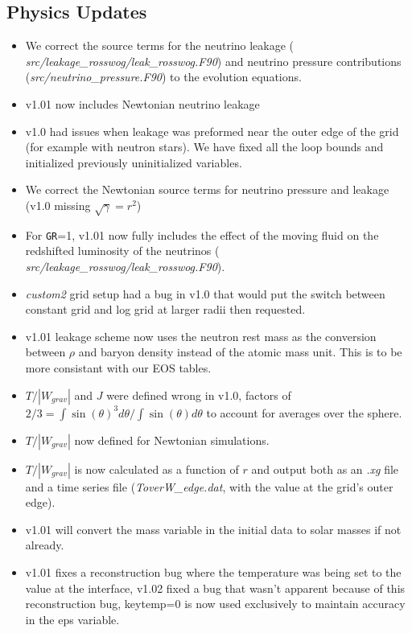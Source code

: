 \documentclass[10pt,nofootinbib]{article}
\begin{document}
\subsection{Physics Updates}
\begin{itemize}
\item We correct the source terms for the neutrino leakage ({\it
    src/leakage\_rosswog/leak\_rosswog.F90}) and neutrino pressure
  contributions ({\it src/neutrino\_pressure.F90}) to the evolution
  equations.
\item v1.01 now includes Newtonian neutrino leakage
\item v1.0 had issues when leakage was preformed near the outer edge
  of the grid (for example with neutron stars).  We have fixed all the
  loop bounds and initialized previously uninitialized variables. 
\item We correct the Newtonian source terms for neutrino pressure and
  leakage (v1.0 missing $\sqrt{\gamma}=r^2$)
\item For {\tt GR}=1, v1.01 now fully includes the effect of the
  moving fluid on the redshifted luminosity of the neutrinos ({\it
    src/leakage\_rosswog/leak\_rosswog.F90}).
\item {\emph{custom2}} grid setup had a bug in v1.0 that would put the
  switch between constant grid and log grid at larger radii then
  requested.
\item v1.01 leakage scheme now uses the neutron rest mass as the
  conversion between $\rho$ and baryon density instead of the atomic
  mass unit.  This is to be more consistant with our EOS tables. 
\item $T/|W_{grav}|$ and $J$ were defined wrong in v1.0, factors of
  $2/3 = \int \sin(\theta)^3 d\theta / \int \sin(\theta)d\theta$ to
  account for averages over the sphere.
\item $T/|W_{grav}|$ now defined for Newtonian simulations.
\item $T/|W_{grav}|$ is now calculated as a function of $r$ and output
  both as an {\emph{.xg}} file and a time series file
  ({\emph{ToverW\_edge.dat}}, with the value at the grid's outer edge).
\item v1.01 will convert the mass variable in the initial data to
  solar masses if not already.
\item v1.01 fixes a reconstruction bug where the temperature was being
  set to the value at the interface, v1.02 fixed a bug that wasn't
  apparent because of this reconstruction bug, keytemp=0 is now used
  exclusively to maintain accuracy in the eps variable.

\end{itemize}
\end{document}
